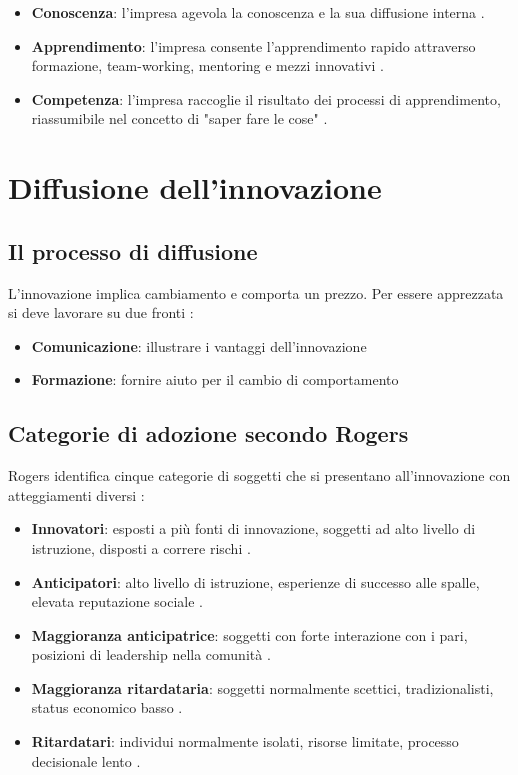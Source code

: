 \documentclass[12pt,a4paper]{article}
\begin{document}
\begin{itemize}
    \item \textbf{Conoscenza}: l'impresa agevola la conoscenza e la sua diffusione interna .
    \item \textbf{Apprendimento}: l'impresa consente l'apprendimento rapido attraverso formazione, team-working, mentoring e mezzi innovativi .
    \item \textbf{Competenza}: l'impresa raccoglie il risultato dei processi di apprendimento, riassumibile nel concetto di "saper fare le cose" .
\end{itemize}

\section{Diffusione dell'innovazione}

\subsection{Il processo di diffusione}
L'innovazione implica cambiamento e comporta un prezzo. Per essere apprezzata si deve lavorare su due fronti :
\begin{itemize}
    \item \textbf{Comunicazione}: illustrare i vantaggi dell'innovazione
    \item \textbf{Formazione}: fornire aiuto per il cambio di comportamento
\end{itemize}

\subsection{Categorie di adozione secondo Rogers}
Rogers identifica cinque categorie di soggetti che si presentano all'innovazione con atteggiamenti diversi :

\begin{itemize}
    \item \textbf{Innovatori}: esposti a più fonti di innovazione, soggetti ad alto livello di istruzione, disposti a correre rischi .
    \item \textbf{Anticipatori}: alto livello di istruzione, esperienze di successo alle spalle, elevata reputazione sociale .
    \item \textbf{Maggioranza anticipatrice}: soggetti con forte interazione con i pari, posizioni di leadership nella comunità .
    \item \textbf{Maggioranza ritardataria}: soggetti normalmente scettici, tradizionalisti, status economico basso .
    \item \textbf{Ritardatari}: individui normalmente isolati, risorse limitate, processo decisionale lento .
\end{itemize}
\end{document}
